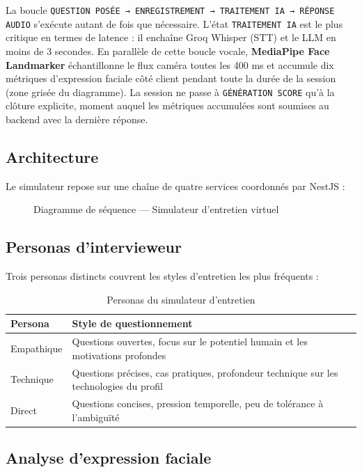 ﻿\documentclass[12pt,a4paper]{report}
\begin{document}
La boucle \texttt{QUESTION POSÉE → ENREGISTREMENT → TRAITEMENT IA → RÉPONSE AUDIO} s'exécute autant de fois que nécessaire. L'état \texttt{TRAITEMENT IA} est le plus critique en termes de latence : il enchaîne Groq Whisper (STT) et le LLM en moins de 3 secondes. En parallèle de cette boucle vocale, \textbf{MediaPipe Face Landmarker} échantillonne le flux caméra toutes les 400 ms et accumule dix métriques d'expression faciale côté client pendant toute la durée de la session (zone grisée du diagramme). La session ne passe à \texttt{GÉNÉRATION SCORE} qu'à la clôture explicite, moment auquel les métriques accumulées sont soumises au backend avec la dernière réponse.

\subsection{Architecture}

Le simulateur repose sur une chaîne de quatre services coordonnés par NestJS :

\begin{figure}[H]
\centering
\resizebox{\textwidth}{!}{}
\caption{Diagramme de séquence — Simulateur d'entretien virtuel}
\label{fig:seq_interview}
\end{figure}

\subsection{Personas d'intervieweur}

Trois personas distincts couvrent les styles d'entretien les plus fréquents :

\begin{table}[H]
\centering
\begin{tabularx}{\textwidth}{lX}
\toprule
\textbf{Persona} & \textbf{Style de questionnement} \\
\midrule
Empathique & Questions ouvertes, focus sur le potentiel humain et les motivations profondes \\
Technique & Questions précises, cas pratiques, profondeur technique sur les technologies du profil \\
Direct & Questions concises, pression temporelle, peu de tolérance à l'ambiguïté \\
\bottomrule
\end{tabularx}
\caption{Personas du simulateur d'entretien}
\end{table}

\subsection{Analyse d'expression faciale}
\end{document}
